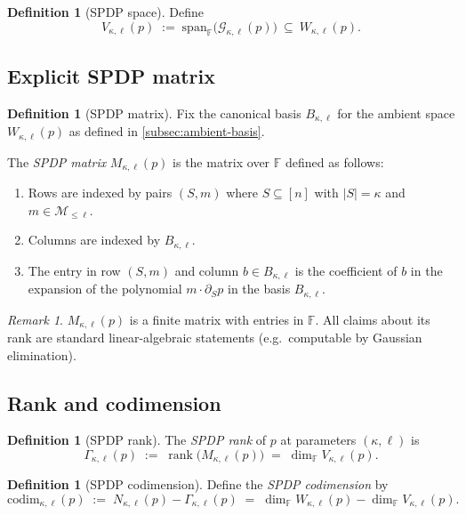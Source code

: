 \documentclass[12pt]{article}
\theoremstyle{definition}
\newtheorem{definition}[theorem]{Definition}
\theoremstyle{remark}
\newtheorem{remark}[theorem]{Remark}
\newcommand{\F}{\mathbb{F}}
\newcommand{\codim}{\mathrm{codim}}
\DeclareMathOperator{\rk}{rank}
\begin{document}
\begin{definition}[SPDP space]
\label{def:Vkl}
Define
\[
  V_{\kappa,\ell}(p) \;:=\; \mathrm{span}_\F\bigl(\mathcal{G}_{\kappa,\ell}(p)\bigr)\ \subseteq\ W_{\kappa,\ell}(p).
\]
\end{definition}

\subsection{Explicit SPDP matrix}
\begin{definition}[SPDP matrix]
\label{def:spdp-matrix}
Fix the canonical basis $B_{\kappa,\ell}$ for the ambient space $W_{\kappa,\ell}(p)$ as defined
in \ref{subsec:ambient-basis}.

The \emph{SPDP matrix} $M_{\kappa,\ell}(p)$ is the matrix over $\F$ defined as follows:
\begin{enumerate}[label=(\roman*),leftmargin=2.4em]
\item Rows are indexed by pairs $(S,m)$ where $S \subseteq [n]$ with $|S|=\kappa$
and $m \in \mathcal{M}_{\le \ell}$.
\item Columns are indexed by $B_{\kappa,\ell}$.
\item The entry in row $(S,m)$ and column $b \in B_{\kappa,\ell}$ is the coefficient of $b$
in the expansion of the polynomial $m \cdot \partial_S p$ in the basis $B_{\kappa,\ell}$.
\end{enumerate}
\end{definition}

\begin{remark}
$M_{\kappa,\ell}(p)$ is a finite matrix with entries in $\F$. All claims about its rank are
standard linear-algebraic statements (e.g.\ computable by Gaussian elimination).
\end{remark}

\subsection{Rank and codimension}
\begin{definition}[SPDP rank]
\label{def:spdp-rank}
The \emph{SPDP rank} of $p$ at parameters $(\kappa,\ell)$ is
\[
  \Gamma_{\kappa,\ell}(p) \;:=\; \rk\bigl(M_{\kappa,\ell}(p)\bigr)
  \;=\; \dim_\F V_{\kappa,\ell}(p).
\]
\end{definition}

\begin{definition}[SPDP codimension]
\label{def:spdp-codim}
Define the \emph{SPDP codimension} by
\[
  \codim_{\kappa,\ell}(p) \;:=\; N_{\kappa,\ell}(p) - \Gamma_{\kappa,\ell}(p)
  \;=\; \dim_\F W_{\kappa,\ell}(p) - \dim_\F V_{\kappa,\ell}(p).
\]
\end{definition}
\end{document}
